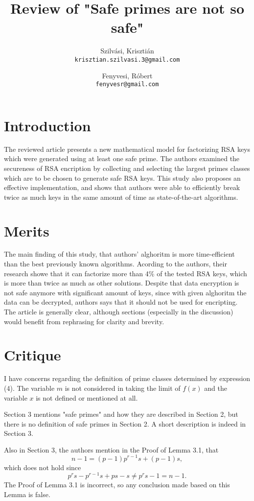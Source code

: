 \documentclass[11 pt,a4paper,english]{article}
\title{Review of "Safe primes are not so safe"}
\author{
	Szilvási, Krisztián\\
	\texttt{krisztian.szilvasi.3@gmail.com}
	\and
	Fenyvesi, Róbert\\
	\texttt{fenyvesr@gmail.com}
}
\begin{document}
\maketitle

\newpage

\section{Introduction}
The reviewed article \cite{safeprimes} presents a new mathematical model for factorizing RSA keys which were generated using at least one safe prime. 
The authors examined the secureness of RSA encription by collecting and selecting the largest primes classes which are to be chosen to generate safe RSA keys. 
This study also proposes an effective implementation, and shows that authors were able to efficiently break twice as much keys in the same amount of time as state-of-the-art algorithms. 


\section{Merits}
The main finding of this study, that authors' alghoritm is more time-efficient than the best previously known algorithms. Acording to the authors, their research showe that it can factorize more than 4\% of the tested RSA keys, which is more than twice as much as other solutions. 
Despite that data encryption is not safe anymore with significant amount of keys, since with given alghoritm the data can be decrypted, authors says that it should not be used for encripting. 
The article is generally clear, although sections (especially in the discussion) would benefit from rephrasing for clarity and brevity.


\section{Critique}

I have concerns regarding the definition of prime classes determined by expression (4). The variable $m$ is not considered in taking the limit of $f(x)$ and the variable $x$ is not defined or mentioned at all.

Section 3 mentions "safe primes" and how they are described in Section 2, but there is no definition of safe primes in Section 2. A short description is indeed in Section 3.

Also in Section 3, the authors mention in the Proof of Lemma 3.1, that $$n-1=(p-1)p^{r-1}s+(p-1)s,$$ which does not hold since $$p^rs-p^{r-1}s+ps-s \neq p^rs-1=n-1.$$ The Proof of Lemma 3.1 is incorrect, so any conclusion made based on this Lemma is false.
\end{document}
